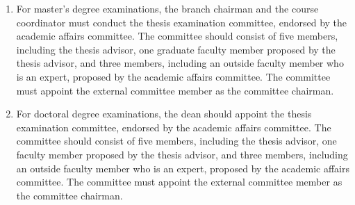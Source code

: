 \begin{enumerate}
\begin{enumerate}
        \item For master's degree examinations, the branch chairman and the course coordinator must conduct the thesis examination committee, endorsed by the academic affairs committee. The committee should consist of five members, including the thesis advisor, one graduate faculty member proposed by the thesis advisor, and three members, including an outside faculty member who is an expert, proposed by the academic affairs committee. The committee must appoint the external committee member as the committee chairman.
        
        \item For doctoral degree examinations, the dean should appoint the thesis examination committee, endorsed by the academic affairs committee. The committee should consist of five members, including the thesis advisor, one faculty member proposed by the thesis advisor, and three members, including an outside faculty member who is an expert, proposed by the academic affairs committee. The committee must appoint the external committee member as the committee chairman.
    \end{enumerate}
\end{enumerate}